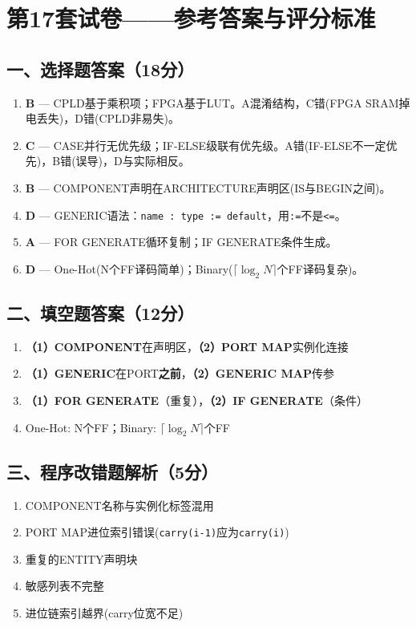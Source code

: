 \chapter{第17套试卷——参考答案与评分标准}

\section{一、选择题答案（18分）}

\begin{enumerate}[label=\arabic*.]
\item \textbf{B} — CPLD基于乘积项；FPGA基于LUT。A混淆结构，C错(FPGA SRAM掉电丢失)，D错(CPLD非易失)。
\item \textbf{C} — CASE并行无优先级；IF-ELSE级联有优先级。A错(IF-ELSE不一定优先)，B错(误导)，D与实际相反。
\item \textbf{B} — COMPONENT声明在ARCHITECTURE声明区(IS与BEGIN之间)。
\item \textbf{D} — GENERIC语法：\texttt{name : type := default}，用\texttt{:=}不是\texttt{<=}。
\item \textbf{A} — FOR GENERATE循环复制；IF GENERATE条件生成。
\item \textbf{D} — One-Hot(N个FF译码简单)；Binary($\lceil\log_2 N\rceil$个FF译码复杂)。
\end{enumerate}

\section{二、填空题答案（12分）}

\begin{enumerate}[label=\arabic*.]
\item \textbf{（1）COMPONENT}在声明区，\textbf{（2）PORT MAP}实例化连接
\item \textbf{（1）GENERIC}在PORT\textbf{之前}，\textbf{（2）GENERIC MAP}传参
\item \textbf{（1）FOR GENERATE}（重复），\textbf{（2）IF GENERATE}（条件）
\item One-Hot: N个FF；Binary: $\lceil\log_2 N\rceil$个FF
\end{enumerate}

\section{三、程序改错题解析（5分）}
{\small
\begin{enumerate}[label=错误\arabic*：]
\item COMPONENT名称与实例化标签混用
\item PORT MAP进位索引错误(\texttt{carry(i-1)}应为\texttt{carry(i)})
\item 重复的ENTITY声明块
\item 敏感列表不完整
\item 进位链索引越界(carry位宽不足)
\end{enumerate}
}

